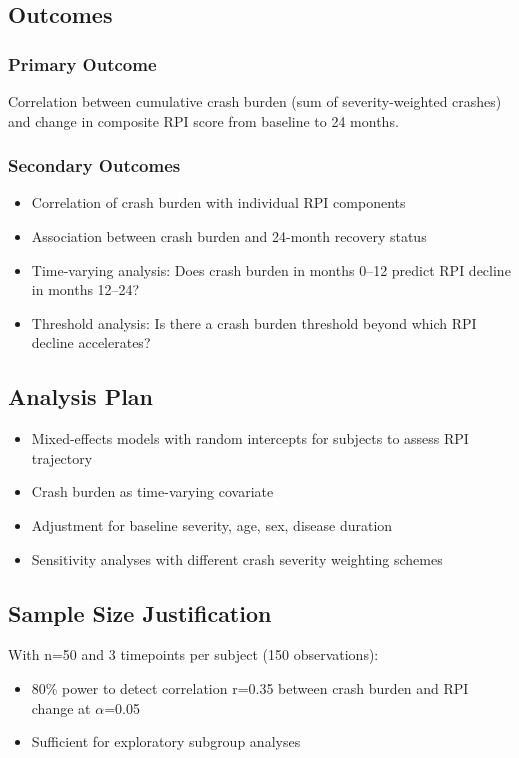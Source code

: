 \subsection{Outcomes}

\subsubsection{Primary Outcome}
Correlation between cumulative crash burden (sum of severity-weighted crashes) and change in composite RPI score from baseline to 24 months.

\subsubsection{Secondary Outcomes}
\begin{itemize}
    \item Correlation of crash burden with individual RPI components
    \item Association between crash burden and 24-month recovery status
    \item Time-varying analysis: Does crash burden in months 0--12 predict RPI decline in months 12--24?
    \item Threshold analysis: Is there a crash burden threshold beyond which RPI decline accelerates?
\end{itemize}

\subsection{Analysis Plan}

\begin{itemize}
    \item Mixed-effects models with random intercepts for subjects to assess RPI trajectory
    \item Crash burden as time-varying covariate
    \item Adjustment for baseline severity, age, sex, disease duration
    \item Sensitivity analyses with different crash severity weighting schemes
\end{itemize}

\subsection{Sample Size Justification}

With n=50 and 3 timepoints per subject (150 observations):
\begin{itemize}
    \item 80\% power to detect correlation r=0.35 between crash burden and RPI change at $\alpha$=0.05
    \item Sufficient for exploratory subgroup analyses
\end{itemize}

